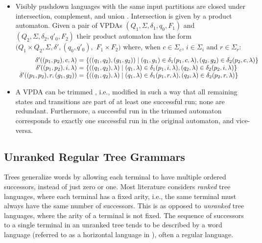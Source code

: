 \documentclass[runningheads]{llncs}
\newcommand{\T}{\Sigma} %
\begin{document}
\begin{itemize}
\item Visibly pushdown languages with the same input partitions
  are closed under intersection, complement, and union
  \cite{alurVisiblyPushdownLanguages2004}. Intersection is given
  by a product automaton. Given a pair of VPDAs
  $(Q_1, \T, \delta_1, q_0, F_1)$ and
  $(Q_2, \T, \delta_2, q'_0, F_2)$ their product automaton has the
  form $(Q_1 \times Q_2, \T, \delta', (q_0, q'_0),$
  $ F_1 \times F_2)$ where, when $c \in \T_c$, $i \in \T_i$ and
  $r \in \T_r$:
  \[
  \begin{array}{r@{\ =\ }l}
    \delta'((p_1, p_2), c, \lambda) & \{((q_1, q_2), (g_1, g_2)) \mid (q_1, g_1) \in \delta_1(p_1, c, \lambda), (q_2, g_2) \in \delta_2(p_2, c, \lambda) \}\\
    \delta'((p_1, p_2), i, \lambda) & \{((q_1, q_2), \lambda) \mid (q_1, \lambda) \in \delta_1(p_1, i, \lambda), (q_2, \lambda) \in \delta_2(p_2, i, \lambda) \}\\
    \delta'((p_1, p_2), r, (g_1, g_2)) & \{((q_1, q_2), \lambda) \mid (q_1, \lambda) \in \delta_1(p_1, r, \lambda), (q_2, \lambda) \in \delta_2(p_2, r, \lambda) \}\\
  \end{array}
  \]

\item A VPDA can be trimmed \cite{caralpTrimmingVisiblyPushdown2015}, i.e., modified in such a way that all remaining states and transitions are part of at least one successful run; none are redundant. Furthermore, a successful run in the trimmed automaton corresponds to exactly one successful run in the original automaton, and vice-versa.
\end{itemize}

\subsection{Unranked Regular Tree Grammars} \label{sec:preliminaries-trees}

Trees generalize words by allowing each terminal to have multiple ordered successors, instead of just zero or one. Most literature considers \emph{ranked} tree languages, where each terminal has a fixed arity, i.e., the same terminal must always have the same number of successors. This is as opposed to \emph{unranked} tree languages, where the arity of a terminal is not fixed. The sequence of successors to a single terminal in an unranked tree tends to be described by a word language (referred to as a horizontal language in \cite{comonTreeAutomataTechniques2007}), often a regular language.
\end{document}
